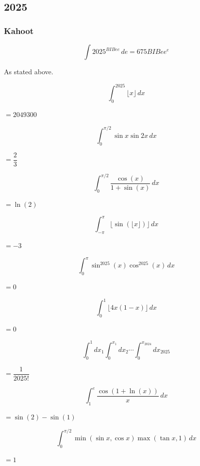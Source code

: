 \subsection*{2025}

\subsubsection*{Kahoot}
\begin{questions}

\question \[ \int 2025^{BIBee}\, de = 675 BIBee^e \]
\begin{solution} As stated above. \end{solution}

\question \[ \int_0^{2025} \lfloor x\rfloor\, dx \]
\begin{solution} $= 2049300$ \end{solution}

\question \[ \int_0^{\pi/2} \sin x \sin 2x\, dx \]
\begin{solution} $= \dfrac{2}{3}$ \end{solution}

\question \[ \int_0^{\pi/2} \frac{\cos(x)}{1+\sin(x)}\, dx \]
\begin{solution} $= \ln(2)$ \end{solution}

\question \[ \int_{-\pi}^{\pi} \lfloor \sin(\lfloor x\rfloor)\rfloor\, dx \]
\begin{solution} $= -3$ \end{solution}

\question \[ \int_0^{\pi} \sin^{2025}(x)\cos^{2025}(x)\, dx \]
\begin{solution} $= 0$ \end{solution}

\question \[ \int_0^1 \lfloor 4x(1-x)\rfloor\, dx \]
\begin{solution} $= 0$ \end{solution}

\question \[ \int_0^1 dx_1 \int_0^{x_1} dx_2 \cdots \int_0^{x_{2024}} dx_{2025} \]
\begin{solution} $= \dfrac{1}{2025!}$ \end{solution}

\question \[ \int_1^e \frac{\cos(1+\ln(x))}{x}\, dx \]
\begin{solution} $= \sin(2)-\sin(1)$ \end{solution}

\question \[ \int_0^{\pi/2} \min(\sin x,\cos x)\max(\tan x,1)\, dx \]
\begin{solution} $= 1$ \end{solution}


\end{questions}
